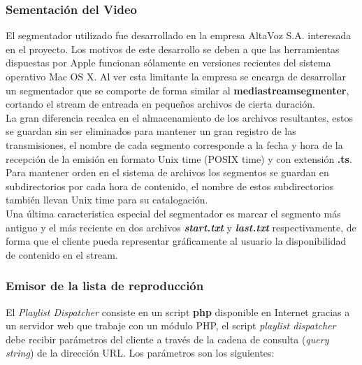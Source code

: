 		\subsubsection{Sementación del Video}

El segmentador utilizado fue desarrollado en la empresa AltaVoz S.A. interesada en el proyecto. Los motivos de este desarrollo se deben a que las herramientas dispuestas por Apple funcionan sólamente en versiones recientes del sistema operativo Mac OS X. Al ver esta limitante la empresa se encarga de desarrollar un segmentador que se comporte de forma similar al \textbf{mediastreamsegmenter}, cortando el stream de entreada en pequeños archivos de cierta duración.\\

 La gran diferencia recalca en el almacenamiento de los archivos resultantes, estos se guardan sin ser eliminados para mantener un gran registro de las transmisiones, el nombre de cada segmento corresponde a la fecha y hora de la recepción de la emisión en formato Unix time (POSIX time) y con extensión \textbf{.ts}. Para mantener orden en el sistema de archivos los segmentos se guardan en subdirectorios por cada hora de contenido, el nombre de estos subdirectorios también llevan Unix time para su catalogación.\\

Una última caracteristica especial del segmentador es marcar el segmento más antiguo y el más reciente en dos archivos \textbf{\textit{start.txt}} y \textbf{\textit{last.txt}} respectivamente, de forma que el cliente pueda representar gráficamente al usuario la disponibilidad de contenido en el stream.
		
		\subsubsection{Emisor de la lista de reproducción}
El \textit{Playlist Dispatcher} consiste en un script \textbf{php} disponible en Internet gracias a un servidor web que trabaje con un módulo PHP, el script \textit{playlist dispatcher} debe recibir parámetros del cliente a través de la cadena de consulta (\textit{query string}) de la dirección URL. Los parámetros son los siguientes:

